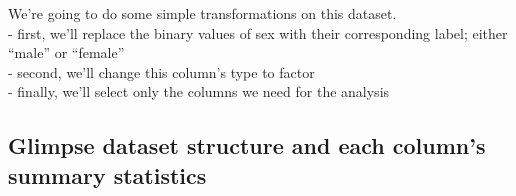 \documentclass[
]{article}
\newenvironment{Shaded}{\begin{snugshade}}{\end{snugshade}}
\newcommand{\AttributeTok}[1]{\textcolor[rgb]{0.77,0.63,0.00}{#1}}
\newcommand{\ConstantTok}[1]{\textcolor[rgb]{0.00,0.00,0.00}{#1}}
\newcommand{\DecValTok}[1]{\textcolor[rgb]{0.00,0.00,0.81}{#1}}
\newcommand{\FunctionTok}[1]{\textcolor[rgb]{0.00,0.00,0.00}{#1}}
\newcommand{\NormalTok}[1]{#1}
\newcommand{\OtherTok}[1]{\textcolor[rgb]{0.56,0.35,0.01}{#1}}
\newcommand{\SpecialCharTok}[1]{\textcolor[rgb]{0.00,0.00,0.00}{#1}}
\newcommand{\StringTok}[1]{\textcolor[rgb]{0.31,0.60,0.02}{#1}}
\begin{document}
We're going to do some simple transformations on this dataset.\\
- first, we'll replace the binary values of sex with their corresponding
label; either ``male'' or ``female''\\
- second, we'll change this column's type to factor\\
- finally, we'll select only the columns we need for the analysis

\begin{Shaded}
\end{Shaded}

\hypertarget{glimpse-dataset-structure-and-each-columns-summary-statistics}{%
\subsection{Glimpse dataset structure and each column's summary
statistics}\label{glimpse-dataset-structure-and-each-columns-summary-statistics}}
\end{document}

